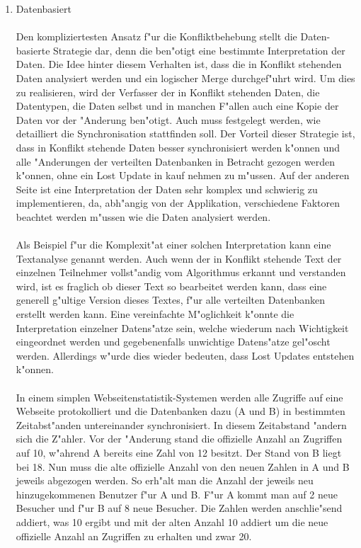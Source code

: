 \documentclass[a4paper,14pt]{scrreprt}
\begin{document}
\begin{enumerate}
\item Datenbasiert\\\\Den kompliziertesten Ansatz f"ur die Konfliktbehebung stellt die Daten-basierte Strategie dar, denn die ben"otigt eine bestimmte Interpretation der Daten. Die Idee hinter diesem Verhalten ist, dass die in Konflikt stehenden Daten analysiert werden und ein logischer Merge durchgef"uhrt wird. Um dies zu realisieren, wird der Verfasser der in Konflikt stehenden Daten, die Datentypen, die Daten selbst und in manchen F"allen auch eine Kopie der Daten vor der "Anderung ben"otigt. Auch muss festgelegt werden, wie detailliert die Synchronisation stattfinden soll. Der Vorteil dieser Strategie ist, dass in Konflikt stehende Daten besser synchronisiert werden k"onnen und alle "Anderungen der verteilten Datenbanken in Betracht gezogen werden k"onnen, ohne ein Lost Update in kauf nehmen zu m"ussen. Auf der anderen Seite ist eine Interpretation der Daten sehr komplex und schwierig zu implementieren, da, abh"angig von der Applikation, verschiedene Faktoren beachtet werden m"ussen wie die Daten analysiert werden. \\\\Als Beispiel f"ur die Komplexit"at einer solchen Interpretation kann eine Textanalyse genannt werden. Auch wenn der in Konflikt stehende Text der einzelnen Teilnehmer vollst"andig vom Algorithmus erkannt und verstanden wird, ist es fraglich ob dieser Text so bearbeitet werden kann, dass eine generell g"ultige Version dieses Textes, f"ur alle verteilten Datenbanken erstellt werden kann. Eine vereinfachte M"oglichkeit k"onnte die Interpretation einzelner Datens"atze sein, welche wiederum nach Wichtigkeit eingeordnet werden und gegebenenfalls unwichtige Datens"atze gel"oscht werden. Allerdings w"urde dies wieder bedeuten, dass Lost Updates entstehen k"onnen.\\\\In einem simplen Webseitenstatistik-Systemen werden alle Zugriffe auf eine Webseite protokolliert und die Datenbanken dazu (A und B) in bestimmten Zeitabst"anden untereinander synchronisiert. In diesem Zeitabstand "andern sich die Z"ahler. Vor der "Anderung stand die offizielle Anzahl an Zugriffen auf 10, w"ahrend A bereits eine Zahl von 12 besitzt. Der Stand von B liegt bei 18. Nun muss die alte offizielle Anzahl von den neuen Zahlen in A und B jeweils abgezogen werden. So erh"alt man die Anzahl der jeweils neu hinzugekommenen Benutzer f"ur A und B. F"ur A kommt man auf 2 neue Besucher und f"ur B auf 8 neue Besucher. Die Zahlen werden anschlie"send addiert, was 10 ergibt und mit der alten Anzahl 10 addiert um die neue offizielle Anzahl an Zugriffen zu erhalten und zwar 20.
\end{enumerate}
\cite{ausWo}
\end{document}
